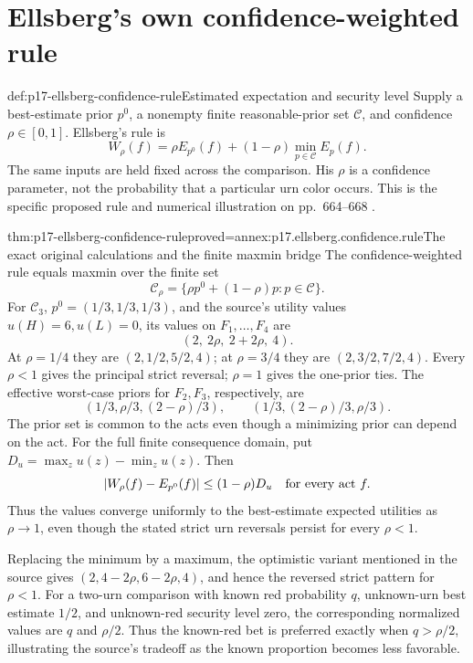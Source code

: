 \section{Ellsberg's own confidence-weighted rule}

\begin{hbdefinition}{def:p17-ellsberg-confidence-rule}{Estimated expectation and security level}
Supply a best-estimate prior \(p^0\), a nonempty finite
reasonable-prior set \(\mathcal C\), and confidence
\(\rho\in[0,1]\). Ellsberg's rule is
\[
           W_\rho(f)=\rho E_{p^0}(f)
                             +(1-\rho)\min_{p\in\mathcal C}E_p(f).
\]
The same inputs are held fixed across the comparison.
His \(\rho\) is a confidence parameter, not the probability
that a particular urn color occurs. This is the specific
proposed rule and numerical illustration on
pp.~664--668 \cite{Ellsberg1961Ambiguity}.
\end{hbdefinition}

\begin{hbtheorem}{thm:p17-ellsberg-confidence-rule}{proved=annex:p17.ellsberg.confidence.rule}{The exact original calculations and the finite maxmin bridge}
The confidence-weighted rule equals maxmin over the finite set
\[
                 \mathcal C_\rho=
                     \{\rho p^0+(1-\rho)p:p\in\mathcal C\}.
\]
For \(\mathcal C_3\), \(p^0=(1/3,1/3,1/3)\), and the
source's utility values \(u(H)=6,u(L)=0\), its values on
\(F_1,\ldots,F_4\) are
\[
                         (2,\ 2\rho,\ 2+2\rho,\ 4).
\]
At \(\rho=1/4\) they are \((2,1/2,5/2,4)\);
at \(\rho=3/4\) they are \((2,3/2,7/2,4)\).
Every \(\rho<1\) gives the principal strict reversal;
\(\rho=1\) gives the one-prior ties.
The effective worst-case priors for \(F_2,F_3\), respectively,
are
\[
       (1/3,\rho/3,(2-\rho)/3),\qquad
       (1/3,(2-\rho)/3,\rho/3).
\]
The prior set is common to the acts even though a minimizing
prior can depend on the act.
For the full finite consequence domain, put
\(D_u=\max_z u(z)-\min_z u(z)\). Then
\[
             |W_\rho(f)-E_{p^0}(f)|\leq(1-\rho)D_u
                         \quad\hbox{for every act }f.
\]
Thus the values converge uniformly to the best-estimate
expected utilities as \(\rho\to1\), even though the stated
strict urn reversals persist for every \(\rho<1\).

Replacing the minimum by a maximum, the optimistic variant
mentioned in the source gives
\((2,4-2\rho,6-2\rho,4)\), and hence the reversed strict
pattern for \(\rho<1\).
For a two-urn comparison with known red probability \(q\),
unknown-urn best estimate \(1/2\), and unknown-red security
level zero, the corresponding normalized values are
\(q\) and \(\rho/2\). Thus the known-red bet is preferred
exactly when \(q>\rho/2\), illustrating the source's
tradeoff as the known proportion becomes less favorable.
\end{hbtheorem}

